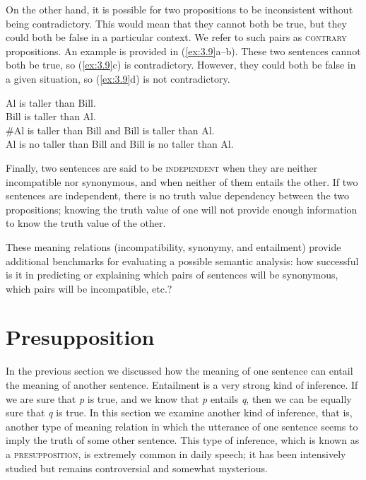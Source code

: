 On the other hand, it is possible for two propositions to be inconsistent without being contradictory. This would mean that they cannot both be true, but they could both be false in a particular context. We refer to such pairs as \textsc{contrary} propositions. An example is provided in (\ref{ex:3.9}a--b). These two sentences cannot both be true, so (\ref{ex:3.9}c) is contradictory. However, they could both be false in a given situation, so (\ref{ex:3.9}d) is not contradictory.


\ea \label{ex:3.9}
\ea Al is taller than Bill.\\
\ex Bill is taller than Al.\\
\ex \#Al is taller than Bill and Bill is taller than Al.\\
\ex Al is no taller than Bill and Bill is no taller than Al.
                       \z
\z


Finally, two sentences are said to be \textsc{independent} when they are neither incompatible nor synonymous, and when neither of them entails the other. If two sentences are independent, there is no truth value dependency between the two propositions; knowing the truth value of one will not provide enough information to know the truth value of the other.



These meaning relations (incompatibility, synonymy, and entailment) provide additional benchmarks for evaluating a possible semantic analysis: how successful is it in predicting or explaining which pairs of sentences will be synonymous, which pairs will be incompatible, etc.?


\section{Presupposition}\label{sec:3.4}

In the previous section we discussed how the meaning of one sentence can entail the meaning of another sentence. Entailment is a very strong kind of inference. If we are sure that \textit{p} is true, and we know that \textit{p} entails \textit{q}, then we can be equally sure that \textit{q} is true. In this section we examine another kind of inference, that is, another type of meaning relation in which the utterance of one sentence seems to imply the truth of some other sentence. This type of inference, which is known as a \textsc{presupposition}, is extremely common in daily speech; it has been intensively studied but remains controversial and somewhat mysterious.



